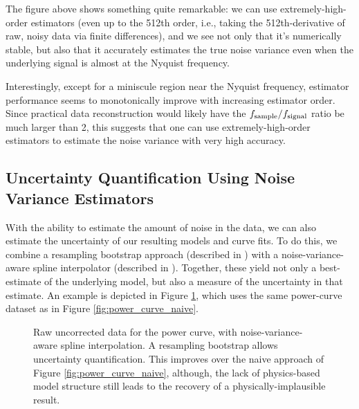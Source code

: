 \documentclass[conf]{new-aiaa}
\begin{document}
    The figure above shows something quite remarkable: we can use extremely-high-order estimators (even up to the 512th order, i.e., taking the 512th-derivative of raw, noisy data via finite differences), and we see not only that it's numerically stable, but also that it accurately estimates the true noise variance even when the underlying signal is almost at the Nyquist frequency.

    Interestingly, except for a miniscule region near the Nyquist frequency, estimator performance seems to monotonically improve with increasing estimator order. Since practical data reconstruction would likely have the $f_{\rm sample} / f_{\rm signal}$ ratio be much larger than 2, this suggests that one can use extremely-high-order estimators to estimate the noise variance with very high accuracy.

    \subsection{Uncertainty Quantification Using Noise Variance Estimators}

    With the ability to estimate the amount of noise in the data, we can also estimate the uncertainty of our resulting models and curve fits. To do this, we combine a resampling bootstrap approach (described in \cite{surrogates, elements_of_statistical_learning}) with a noise-variance-aware spline interpolator (described in \cite{surrogates, wahba}). Together, these yield not only a best-estimate of the underlying model, but also a measure of the uncertainty in that estimate. An example is depicted in Figure \ref{fig:power_curve_spline_but_no_physics}, which uses the same power-curve dataset as in Figure \ref{fig:power_curve_naive}.

    \begin{figure}[!htb]
        \centering
        \caption{Raw uncorrected data for the power curve, with noise-variance-aware spline interpolation. A resampling bootstrap allows uncertainty quantification. This improves over the naive approach of Figure \ref{fig:power_curve_naive}, although, the lack of physics-based model structure still leads to the recovery of a physically-implausible result.}
        \label{fig:power_curve_spline_but_no_physics}
    \end{figure}
\end{document}
